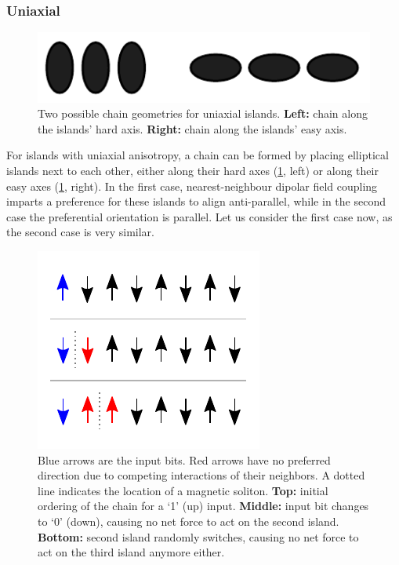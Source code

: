 \documentclass[11pt,a4paper,english,twoside]{article}
\begin{document}
\subsubsection{Uniaxial}
\begin{figure}[b!]
    \centering
    \includegraphics[width=0.6\columnwidth]{Figures/Introduction/Uniaxial_chains.pdf}
    \caption{Two possible chain geometries for uniaxial islands. \textbf{Left:} chain along the islands' hard axis. \textbf{Right:} chain along the islands' easy axis.}
    \label{fig:Intro_IslandEllipticChainGeometries}
\end{figure}
For islands with uniaxial anisotropy, a chain can be formed by placing elliptical islands next to each other, either along their hard axes (\cref{fig:Intro_IslandEllipticChainGeometries}, left) or along their easy axes (\cref{fig:Intro_IslandEllipticChainGeometries}, right). In the first case, nearest-neighbour dipolar field coupling imparts a preference for these islands to align anti-parallel, while in the second case the preferential orientation is parallel. Let us consider the first case now, as the second case is very similar. \par
\begin{figure}[t!]
    \centering
    \includegraphics[width=0.5\columnwidth]{Figures/Introduction/Soliton_random_walk_2steps.pdf}
    \caption{Blue arrows are the input bits. Red arrows have no preferred direction due to competing interactions of their neighbors. A dotted line indicates the location of a magnetic soliton. \textbf{Top:} initial ordering of the chain for a `1' (up) input. \textbf{Middle:} input bit changes to `0' (down), causing no net force to act on the second island. \textbf{Bottom:} second island randomly switches, causing no net force to act on the third island anymore either.}
    \label{fig:Intro_SolitonRandomWalk}
\end{figure}
\end{document}
